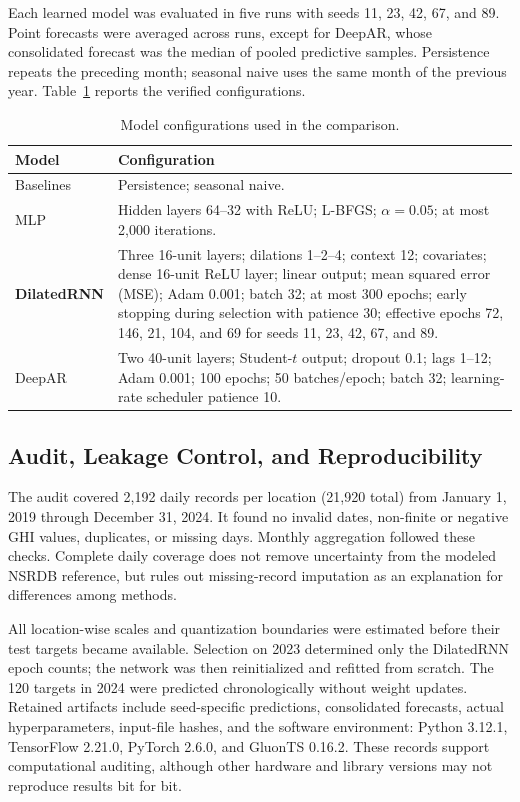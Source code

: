 \documentclass[runningheads]{llncs}
\begin{document}
Each learned model was evaluated in five runs with seeds 11, 23, 42, 67, and 89. Point forecasts were averaged across runs, except for DeepAR, whose consolidated forecast was the median of pooled predictive samples. Persistence repeats the preceding month; seasonal naive uses the same month of the previous year. Table~\ref{tab:configuration} reports the verified configurations.

\begin{table}[t]
\caption{Model configurations used in the comparison.}
\label{tab:configuration}
\centering
\scriptsize
\renewcommand{\arraystretch}{1.04}
\begin{tabular}{@{}>{\raggedright\arraybackslash}p{1.75cm}>{\raggedright\arraybackslash}p{9.75cm}@{}}
\toprule
\textbf{Model} & \textbf{Configuration} \\
\midrule
Baselines & Persistence; seasonal naive. \\
MLP & Hidden layers 64--32 with ReLU; L-BFGS; $\alpha=0.05$; at most 2,000 iterations. \\
\textbf{DilatedRNN} & Three 16-unit layers; dilations 1--2--4; context 12; covariates; dense 16-unit ReLU layer; linear output; mean squared error (MSE); Adam 0.001; batch 32; at most 300 epochs; early stopping during selection with patience 30; effective epochs 72, 146, 21, 104, and 69 for seeds 11, 23, 42, 67, and 89. \\
DeepAR & Two 40-unit layers; Student-$t$ output; dropout 0.1; lags 1--12; Adam 0.001; 100 epochs; 50 batches/epoch; batch 32; learning-rate scheduler patience 10. \\
\bottomrule
\end{tabular}
\end{table}

\subsection{Audit, Leakage Control, and Reproducibility}

The audit covered 2,192 daily records per location (21,920 total) from January 1, 2019 through December 31, 2024. It found no invalid dates, non-finite or negative GHI values, duplicates, or missing days. Monthly aggregation followed these checks. Complete daily coverage does not remove uncertainty from the modeled NSRDB reference, but rules out missing-record imputation as an explanation for differences among methods.

All location-wise scales and quantization boundaries were estimated before their test targets became available. Selection on 2023 determined only the DilatedRNN epoch counts; the network was then reinitialized and refitted from scratch. The 120 targets in 2024 were predicted chronologically without weight updates. Retained artifacts include seed-specific predictions, consolidated forecasts, actual hyperparameters, input-file hashes, and the software environment: Python 3.12.1, TensorFlow 2.21.0, PyTorch 2.6.0, and GluonTS 0.16.2. These records support computational auditing, although other hardware and library versions may not reproduce results bit for bit.
\end{document}
